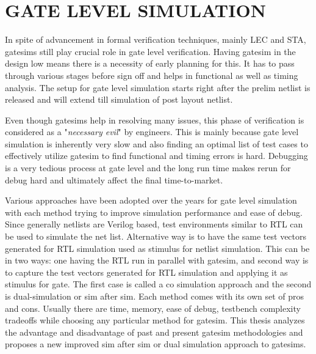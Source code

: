 \section{GATE LEVEL SIMULATION}

In spite of advancement in formal verification techniques, mainly LEC and STA, gatesims still play crucial role in gate level verification.   Having gatesim in the design low means there is a necessity of early planning for this. It has to pass through various stages before sign off and helps in functional as well as timing analysis. The setup for gate level simulation starts right after the prelim netlist is released and will extend till simulation of post layout netlist.  

Even though gatesims help in resolving many issues, this phase of verification is considered as a "{\it necessary evil}" by engineers. This is mainly because gate level simulation is inherently very slow and also finding an optimal list of test cases to effectively utilize gatesim to find functional and timing errors is hard. Debugging is a very tedious process at gate level and the long run time makes rerun for debug hard and ultimately affect the final time-to-market.  

Various approaches have been adopted over the years for gate level simulation with each method trying to improve simulation performance and ease of debug. Since generally netlists are Verilog based, test environments similar to RTL can be used to simulate the net list. Alternative way is to have the same test vectors generated for RTL simulation used as stimulus for netlist simulation. This can be in two ways: one having the RTL run in parallel with gatesim, and second way is to capture the test vectors generated for RTL simulation and applying it as stimulus for gate. The first case is called a co simulation approach and the second is dual-simulation or sim after sim. Each method comes with its own set of pros and cons. Usually there are time, memory, ease of debug, testbench complexity tradeoffs while choosing any particular method for gatesim. This thesis analyzes the advantage and disadvantage of past and present gatesim methodologies and  proposes a new improved sim after sim or dual simulation approach to gatesims. 



